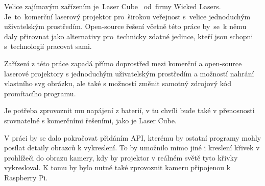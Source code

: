 Velice zajímavým zařízením je~Laser Cube~\cite{lasercube} od~firmy Wicked Lasers. Je~to~komerční laserový projektor pro~širokou veřejnost s~velice jednoduchým uživatelským prostředím. Open-source řešení včetně této práce by~se~k němu daly přirovnat jako alternativy pro~technicky zdatné jedince, kteří jsou schopni s~technologií pracovat sami.

Zařízení z této práce zapadá přímo doprostřed mezi komerční a open-source laserové projektory s jednoduchým uživatelským prostředím a možností nahrání vlastního svg obrázku, ale také s možností změnit samotný zdrojový kód promítacího programu.

Je potřeba zprovoznit mu napájení z baterií, v tu chvíli bude také v přenosnosti srovnatelné s komerčními řešeními, jako je Laser Cube.

V práci by se dalo pokračovat přidáním API, kterému by ostatní programy mohly posílat detaily obrazců k vykreslení. To by umožnilo mimo jiné i kreslení křivek v prohlížeči do obrazu kamery, kdy by projektor v reálném světě tyto křivky vykresloval. K tomu by bylo nutné také zprovoznit kameru připojenou k Raspberry Pi.
